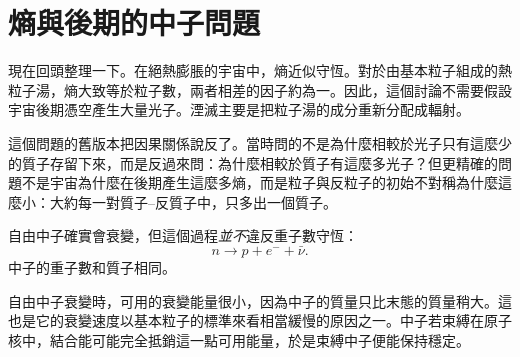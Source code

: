 \begin{classroomqa}
\end{classroomqa}

\section{熵與後期的中子問題}

現在回頭整理一下。在絕熱膨脹的宇宙中，熵近似守恆。對於由基本粒子組成的熱粒子湯，熵大致等於粒子數，兩者相差的因子約為一。因此，這個討論不需要假設宇宙後期憑空產生大量光子。湮滅主要是把粒子湯的成分重新分配成輻射。

這個問題的舊版本把因果關係說反了。當時問的不是為什麼相較於光子只有這麼少的質子存留下來，而是反過來問：為什麼相較於質子有這麼多光子？但更精確的問題不是宇宙為什麼在後期產生這麼多熵，而是粒子與反粒子的初始不對稱為什麼這麼小：大約每一對質子--反質子中，只多出一個質子。

自由中子確實會衰變，但這個過程\emph{並不}違反重子數守恆：
\[
n \to p + e^- + \bar\nu.
\]
中子的重子數和質子相同。

自由中子衰變時，可用的衰變能量很小，因為中子的質量只比末態的質量稍大。這也是它的衰變速度以基本粒子的標準來看相當緩慢的原因之一。中子若束縛在原子核中，結合能可能完全抵銷這一點可用能量，於是束縛中子便能保持穩定。

\begin{classroomqa}
\end{classroomqa}